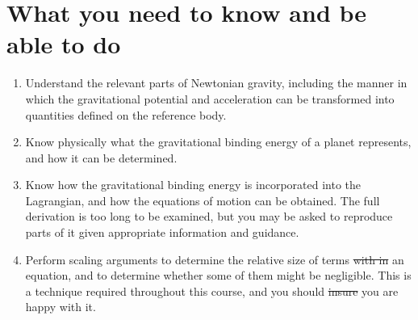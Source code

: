 \documentclass[a4paper,12pt]{paper}
\providecommand{\DIFadd}[1]{{\protect\color{blue}\uwave{#1}}} %
\providecommand{\DIFdel}[1]{{\protect\color{red}\sout{#1}}}                      %
\providecommand{\DIFaddbegin}{} %
\providecommand{\DIFaddend}{} %
\providecommand{\DIFdelbegin}{} %
\providecommand{\DIFdelend}{} %
\begin{document}
\DIFaddend \section*{What you need to know and be able to do}
\DIFdelbegin %
\DIFdelend \DIFaddbegin \begin{enumerate}
    \DIFaddend \item[(i)] Understand the relevant parts of Newtonian gravity, including the manner in which the gravitational potential 
    and acceleration can be transformed into quantities defined on the reference body.
    \item[(ii)] Know physically what the gravitational binding energy of a planet represents, and how it can be determined.
    \item[(iii)] Know how the gravitational binding energy is incorporated into the Lagrangian, and how the equations of 
    motion can be obtained. The full derivation is too long to be examined, but you may be asked to reproduce parts of it 
    given appropriate information and guidance.
    \item[(iv)] Perform scaling arguments to determine the relative size of terms \DIFdelbegin \DIFdel{with in }\DIFdelend \DIFaddbegin \DIFadd{within }\DIFaddend an equation, and to determine 
    whether some of them might be negligible. This is a technique required throughout this course, and you should \DIFdelbegin \DIFdel{insure }\DIFdelend \DIFaddbegin \DIFadd{ensure }\DIFaddend you are happy with it.
\DIFdelbegin %
\DIFdelend \DIFaddbegin \end{enumerate}
\DIFaddend 
\end{document}
